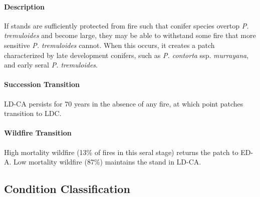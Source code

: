 \paragraph{Description} If stands are sufficiently protected from fire such that conifer species overtop \emph{P. tremuloides} and become large, they may be able to withstand some fire that more sensitive \emph{P. tremuloides} cannot. When this occurs, it creates a patch characterized by late development conifers, such as \emph{P. contorta} ssp. \emph{murrayana}, and early seral \emph{P. tremuloides}. 

\paragraph{Succession Transition} LD-CA persists for 70 years in the absence of any fire, at which point patches transition to LDC. 

\paragraph{Wildfire Transition} High mortality wildfire (13\% of fires in this seral stage) returns the patch to ED-A. Low mortality wildfire (87\%) maintains the stand in LD-CA. 

\noindent\hrulefill

\newpage
\subsection*{Condition Classification}

